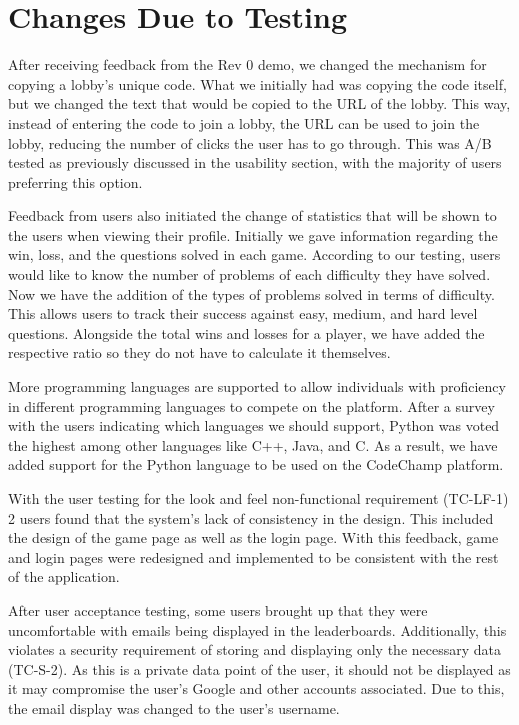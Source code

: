 \documentclass[12pt, titlepage]{article}
\begin{document}
\section{Changes Due to Testing}\label{sec:changes}


After receiving feedback from the Rev 0 demo, we changed the mechanism for copying a lobby's unique code. What we initially had was copying the code itself, but we changed the text that would be copied to the URL of the lobby. This way, instead of entering the code to join a lobby, the URL can be used to join the lobby, reducing the number of clicks the user has to go through. This was A/B tested as previously discussed in the usability section, with the majority of users preferring this option.

Feedback from users also initiated the change of statistics that will be shown to the users when viewing their profile. Initially we gave information regarding the win, loss, and the questions solved in each game. According to our testing, users would like to know the number of problems of each difficulty they have solved. Now we have the addition of the types of problems solved in terms of difficulty. This allows users to track their success against easy, medium, and hard level questions. Alongside the total wins and losses for a player, we have added the respective ratio so they do not have to calculate it themselves.

More programming languages are supported to allow individuals with proficiency in different programming languages to compete on the platform. After a survey with the users indicating which languages we should support, Python was voted the highest among other languages like C++, Java, and C. As a result, we have added support for the Python language to be used on the CodeChamp platform. 

With the user testing for the look and feel non-functional requirement (TC-LF-1) 2 users found that the system's lack of consistency in the design. This included the design of the game page as well as the login page. With this feedback, game and login pages were redesigned and implemented to be consistent with the rest of the application.

After user acceptance testing, some users brought up that they were uncomfortable with emails being displayed in the leaderboards. Additionally, this violates a security  requirement of storing and displaying only the necessary data (TC-S-2). As this is a private data point of the user, it should not be displayed as it may compromise the user's Google and other accounts associated. Due to this, the email display was changed to the user's username. 
\end{document}
